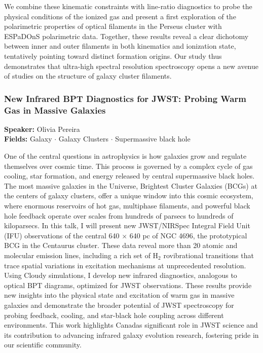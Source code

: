 We combine these kinematic constraints with line-ratio diagnostics to probe the physical conditions of the ionized gas and present a first exploration of the polarimetric properties of optical filaments in the Perseus cluster with ESPaDOnS polarimetric data. Together, these results reveal a clear dichotomy between inner and outer filaments in both kinematics and ionization state, tentatively pointing toward distinct formation origins. Our study thus demonstrates that ultra-high spectral resolution spectroscopy opens a new avenue of studies on the structure of galaxy cluster filaments.

\hypertarget{abstract-talk-184}{}\label{abstract-page-talk-184}
\subsubsection*{New Infrared BPT Diagnostics for JWST: Probing Warm Gas in Massive Galaxies}
\textbf{Speaker:} Olivia Pereira\\
\textbf{Fields:} Galaxy $\cdot$ Galaxy Clusters $\cdot$ Supermassive black hole

One of the central questions in astrophysics is how galaxies grow and regulate themselves over cosmic time. This process is governed by a complex cycle of gas cooling, star formation, and energy released by central supermassive black holes. The most massive galaxies in the Universe, Brightest Cluster Galaxies (BCGs) at the centers of galaxy clusters, offer a unique window into this cosmic ecosystem, where enormous reservoirs of hot gas, multiphase filaments, and powerful black hole feedback operate over scales from hundreds of parsecs to hundreds of kiloparsecs. In this talk, I will present new JWST/NIRSpec Integral Field Unit (IFU) observations of the central 640 $\times$ 640 pc of NGC 4696, the prototypical BCG in the Centaurus cluster. These data reveal more than 20 atomic and molecular emission lines, including a rich set of H$_2$ rovibrational transitions that trace spatial variations in excitation mechanisms at unprecedented resolution. Using Cloudy simulations, I develop new infrared diagnostics, analogous to optical BPT diagrams, optimized for JWST observations. These results provide new insights into the physical state and excitation of warm gas in massive galaxies and demonstrate the broader potential of JWST spectroscopy for probing feedback, cooling, and star-black hole coupling across different environments. This work highlights Canadas significant role in JWST science and its contribution to advancing infrared galaxy evolution research, fostering pride in our scientific community.

